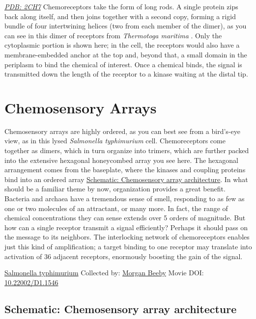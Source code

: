 \documentclass[]{tufte-book}
\begin{document}
\href{http://rcsb.org/structure/2CH7}{\emph{PDB: 2CH7}}
Chemoreceptors take the form of long rods. A single protein zips back along itself, and then joins together with a second copy, forming a rigid bundle of four intertwining helices (two from each member of the dimer), as you can see in this dimer of receptors from \emph{Thermotoga maritima} \citep{park2006}. Only the cytoplasmic portion is shown here; in the cell, the receptors would also have a membrane-embedded anchor at the top and, beyond that, a small domain in the periplasm to bind the chemical of interest. Once a chemical binds, the signal is transmitted down the length of the receptor to a kinase waiting at the distal tip.

\hypertarget{chemosensory-arrays}{%
\section{Chemosensory Arrays}\label{chemosensory-arrays}}

Chemosensory arrays are highly ordered, as you can best see from a bird's-eye view, as in this lysed \emph{Salmonella typhimurium} cell. Chemoreceptors come together as dimers, which in turn organize into trimers, which are further packed into the extensive hexagonal honeycombed array you see here. The hexagonal arrangement comes from the baseplate, where the kinases and coupling proteins bind into an ordered array \protect\hyperlink{Chemosensory_array_architecture}{Schematic: Chemosensory array architecture}. In what should be a familiar theme by now, organization provides a great benefit. Bacteria and archaea have a tremendous sense of smell, responding to as few as one or two molecules of an attractant, or many more. In fact, the range of chemical concentrations they can sense extends over 5 orders of magnitude. But how can a single receptor transmit a signal efficiently? Perhaps it should pass on the message to its neighbors. The interlocking network of chemoreceptors enables just this kind of amplification; a target binding to one receptor may translate into activation of 36 adjacent receptors, enormously boosting the gain of the signal.



\hypertarget{htmlwidget-ec09a32740f59e9cbf85}{}

\label{fig:7-2}\protect\hyperlink{tree}{Salmonella typhimurium} Collected by: \protect\hyperlink{morgan_beeby}{Morgan Beeby} Movie DOI: \href{https://doi.org/10.22002/D1.1546}{10.22002/D1.1546}

\hypertarget{Chemosensory_array_architecture}{%
\subsection*{Schematic: Chemosensory array architecture}\label{Chemosensory_array_architecture}}
\end{document}

